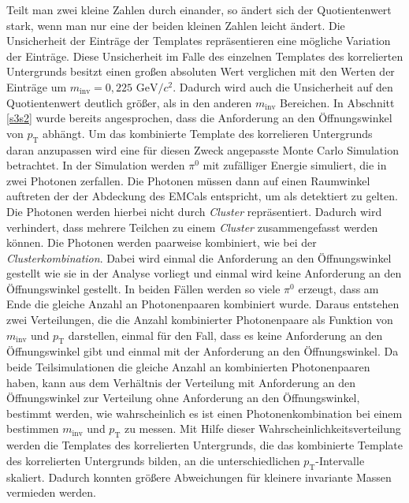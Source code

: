 Teilt man zwei kleine Zahlen durch einander, so ändert sich der Quotientenwert stark, wenn man nur eine der beiden kleinen Zahlen leicht ändert.
Die Unsicherheit der Einträge der Templates repräsentieren eine mögliche Variation der Einträge.
Diese Unsicherheit im Falle des einzelnen Templates des korrelierten Untergrunds besitzt einen großen absoluten Wert verglichen mit den Werten der Einträge um $m_\text{inv} = 0,225\text{ GeV}/c^{2}$.
Dadurch wird auch die Unsicherheit auf den Quotientenwert deutlich größer, als in den anderen $m_\text{inv}$ Bereichen.
\newline
In Abschnitt \ref{s3s2} wurde bereits angesprochen, dass die Anforderung an den Öffnungswinkel von $p_\text{T}$ abhängt.
Um das kombinierte Template des korrelieren Untergrunds daran anzupassen wird eine für diesen Zweck angepasste Monte Carlo Simulation betrachtet.
In der Simulation werden $\pi^{0}$ mit zufälliger Energie simuliert, die in zwei Photonen zerfallen.
Die Photonen müssen dann auf einen Raumwinkel auftreten der der Abdeckung des EMCals entspricht, um als detektiert zu gelten.
Die Photonen werden hierbei nicht durch \textit{Cluster} repräsentiert.
Dadurch wird verhindert, dass mehrere Teilchen zu einem \textit{Cluster} zusammengefasst werden können.
Die Photonen werden paarweise kombiniert, wie bei der \textit{Clusterkombination}.
Dabei wird einmal die Anforderung an den Öffnungswinkel gestellt wie sie in der Analyse vorliegt und einmal wird keine Anforderung an den Öffnungswinkel gestellt.
In beiden Fällen werden so viele $\pi^{0}$ erzeugt, dass am Ende die gleiche Anzahl an Photonenpaaren kombiniert wurde.
Daraus entstehen zwei Verteilungen, die die Anzahl kombinierter Photonenpaare als Funktion von $m_\text{inv}$ und $p_\text{T}$ darstellen, einmal für den Fall, dass es keine Anforderung an den Öffnungswinkel gibt und einmal mit der Anforderung an den Öffnungswinkel.
Da beide Teilsimulationen die gleiche Anzahl an kombinierten Photonenpaaren haben, kann aus dem Verhältnis der Verteilung mit Anforderung an den Öffnungswinkel zur Verteilung ohne Anforderung an den Öffnungswinkel, bestimmt werden, wie wahrscheinlich es ist einen Photonenkombination bei einem bestimmen $m_\text{inv}$ und $p_\text{T}$ zu messen.
Mit Hilfe dieser Wahrscheinlichkeitsverteilung werden die Templates des korrelierten Untergrunds, die das kombinierte Template des korrelierten Untergrunds bilden, an die unterschiedlichen $p_\text{T}$-Intervalle skaliert.
Dadurch konnten größere Abweichungen für kleinere invariante Massen vermieden werden.
\newline
